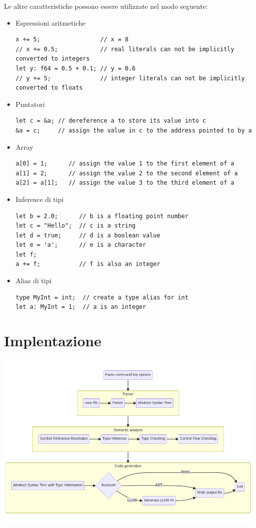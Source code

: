 \documentclass[a4paper]{article}
\begin{document}
Le altre caratteristiche possono essere utilizzate nel modo seguente:
\begin{itemize}
\item Espressioni aritmetiche 
\begin{verbatim}
x += 5;                 // x = 8
// x += 0.5;            // real literals can not be implicitly converted to integers
let y: f64 = 0.5 + 0.1; // y = 0.6
// y += 5;              // integer literals can not be implicitly converted to floats
\end{verbatim}

\item Puntatori
\begin{verbatim}
let c = &a; // dereference a to store its value into c
&a = c;     // assign the value in c to the address pointed to by a
\end{verbatim}

\item Array
\begin{verbatim}
a[0] = 1;      // assign the value 1 to the first element of a
a[1] = 2;      // assign the value 2 to the second element of a
a[2] = a[1];   // assign the value 3 to the third element of a
\end{verbatim}

\item Inference di tipi
\begin{verbatim}
let b = 2.0;      // b is a floating point number
let c = "Hello";  // c is a string
let d = true;     // d is a boolean value
let e = 'a';      // e is a character
let f;
a += f;           // f is also an integer
\end{verbatim}

\item Alias di tipi
\begin{verbatim}
type MyInt = int;  // create a type alias for int
let a: MyInt = 1;  // a is an integer
\end{verbatim}
\end{itemize}


\section{Implentazione}

\includegraphics[width=\textwidth]{implementation.png}
\end{document}
